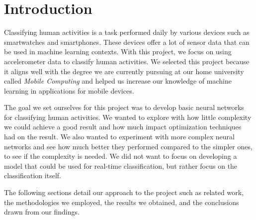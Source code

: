 \section{Introduction}\label{sec:introduction}

Classifying human activities is a task performed daily by various devices such as smartwatches and smartphones.
These devices offer a lot of sensor data that can be used in machine learning contexts.
With this project, we focus on using accelerometer data to classify human activities.
We selected this project because it aligns well with the degree we are currently pursuing at our home university called \emph{Mobile Computing} and helped us increase our knowledge of machine learning in applications for mobile devices.

The goal we set ourselves for this project was to develop basic neural networks for classifying human activities.
We wanted to explore with how little complexity we could achieve a good result and how much impact optimization techniques had on the result.
We also wanted to experiment with more complex neural networks and see how much better they performed compared to the simpler ones, to see if the complexity is needed.
We did not want to focus on developing a model that could be used for real-time classification, but rather focus on the classification itself.

The following sections detail our approach to the project such as related work, the methodologies we employed, the results we obtained, and the conclusions drawn from our findings.
